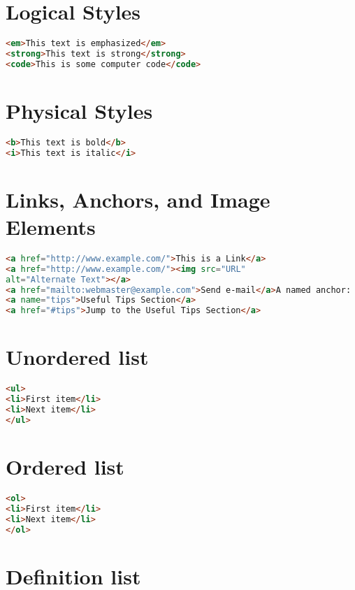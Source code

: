 \section{Logical Styles}

\begin{lstlisting}[language=HTML]
<em>This text is emphasized</em>
<strong>This text is strong</strong>
<code>This is some computer code</code>
\end{lstlisting}


\section{Physical Styles}

\begin{lstlisting}[language=HTML]
<b>This text is bold</b>
<i>This text is italic</i>
\end{lstlisting}


\section{Links, Anchors, and Image Elements}


\begin{lstlisting}[language=HTML]
<a href="http://www.example.com/">This is a Link</a>
<a href="http://www.example.com/"><img src="URL"
alt="Alternate Text"></a>
<a href="mailto:webmaster@example.com">Send e-mail</a>A named anchor:
<a name="tips">Useful Tips Section</a>
<a href="#tips">Jump to the Useful Tips Section</a>
\end{lstlisting}


\section{Unordered list}

\begin{lstlisting}[language=HTML]
<ul>
<li>First item</li>
<li>Next item</li>
</ul>
\end{lstlisting}

\section{Ordered list}


\begin{lstlisting}[language=HTML]
<ol>
<li>First item</li>
<li>Next item</li>
</ol>
\end{lstlisting}

\section{Definition list}


